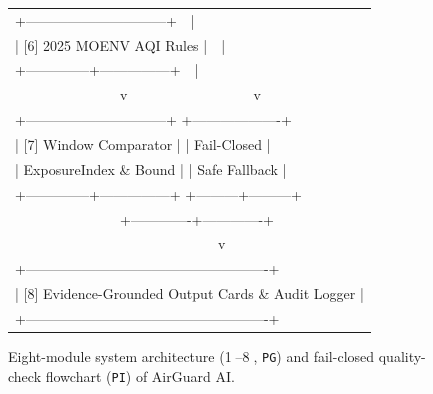 \begin{figure}[!t]
{\begin{tabular}{@{}l@{}}
+------------------------------+\ \ |\\
| [6] 2025 MOENV AQI Rules     |\ \ |\\
+--------------+---------------+\ \ |\\
\ \ \ \ \ \ \ \ \ \ \ \ \ \ \ v\ \ \ \ \ \ \ \ \ \ \ \ \ \ \ \ \ \ v\\
+------------------------------+ +-------------------+\\
| [7] Window Comparator        | | Fail-Closed       |\\
|     ExposureIndex \& Bound    | | Safe Fallback     |\\
+--------------+---------------+ +---------+---------+\\
\ \ \ \ \ \ \ \ \ \ \ \ \ \ \ +-------------+-------------+\\
\ \ \ \ \ \ \ \ \ \ \ \ \ \ \ \ \ \ \ \ \ \ \ \ \ \ \ \ \ v\\
+----------------------------------------------------+\\
| [8] Evidence-Grounded Output Cards \& Audit Logger  |\\
+----------------------------------------------------+
\end{tabular}%
}
\caption{Eight-module system architecture (\textcircled{\scriptsize 1}--\textcircled{\scriptsize 8}, \texttt{PG}) and fail-closed quality-check flowchart (\texttt{PI}) of AirGuard AI.}
\label{fig:arch}
\end{figure}

